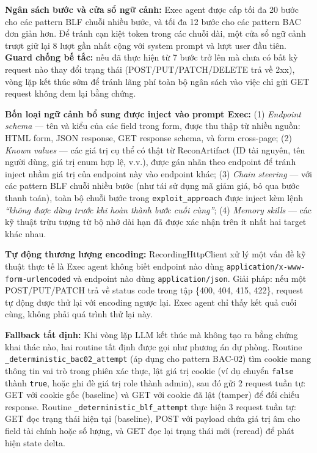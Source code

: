 \textbf{Ngân sách bước và cửa sổ ngữ cảnh:} Exec agent được cấp tối đa 20 bước cho các pattern BLF chuỗi nhiều bước, và tối đa 12 bước cho các pattern BAC đơn giản hơn. Để tránh cạn kiệt token trong các chuỗi dài, một cửa sổ ngữ cảnh trượt giữ lại 8 lượt gần nhất cộng với system prompt và lượt user đầu tiên. \textbf{Guard chống bế tắc:} nếu đã thực hiện từ 7 bước trở lên mà chưa có bất kỳ request nào thay đổi trạng thái (POST/PUT/PATCH/DELETE trả về 2xx), vòng lặp kết thúc sớm để tránh lãng phí toàn bộ ngân sách vào việc chỉ gửi GET request không đem lại bằng chứng.

\textbf{Bốn loại ngữ cảnh bổ sung được inject vào prompt Exec:} (1) \textit{Endpoint schema} --- tên và kiểu của các field trong form, được thu thập từ nhiều nguồn: HTML form, JSON response, GET response schema, và form cross-page; (2) \textit{Known values} --- các giá trị cụ thể có thật từ ReconArtifact (ID tài nguyên, tên người dùng, giá trị enum hợp lệ, v.v.), được gán nhãn theo endpoint để tránh inject nhầm giá trị của endpoint này vào endpoint khác; (3) \textit{Chain steering} --- với các pattern BLF chuỗi nhiều bước (như tái sử dụng mã giảm giá, bỏ qua bước thanh toán), toàn bộ chuỗi bước trong \texttt{exploit\_approach} được inject kèm lệnh \textit{``không được dừng trước khi hoàn thành bước cuối cùng''}; (4) \textit{Memory skills} --- các kỹ thuật trừu tượng từ bộ nhớ dài hạn đã được xác nhận trên ít nhất hai target khác nhau.

\textbf{Tự động thương lượng encoding:} RecordingHttpClient xử lý một vấn đề kỹ thuật thực tế là Exec agent không biết endpoint nào dùng \texttt{application/x-www-form-urlencoded} và endpoint nào dùng \texttt{application/json}. Giải pháp: nếu một POST/PUT/PATCH trả về status code trong tập \{400, 404, 415, 422\}, request tự động được thử lại với encoding ngược lại. Exec agent chỉ thấy kết quả cuối cùng, không phải quá trình thử lại này.

\textbf{Fallback tất định:} Khi vòng lặp LLM kết thúc mà không tạo ra bằng chứng khai thác nào, hai routine tất định được gọi như phương án dự phòng. Routine \texttt{\_deterministic\_bac02\_attempt} (áp dụng cho pattern BAC-02) tìm cookie mang thông tin vai trò trong phiên xác thực, lật giá trị cookie (ví dụ chuyển \texttt{false} thành \texttt{true}, hoặc ghi đè giá trị role thành admin), sau đó gửi 2 request tuần tự: GET với cookie gốc (baseline) và GET với cookie đã lật (tamper) để đối chiếu response. Routine \texttt{\_deterministic\_blf\_attempt} thực hiện 3 request tuần tự: GET đọc trạng thái hiện tại (baseline), POST với payload chứa giá trị âm cho field tài chính hoặc số lượng, và GET đọc lại trạng thái mới (reread) để phát hiện state delta.

